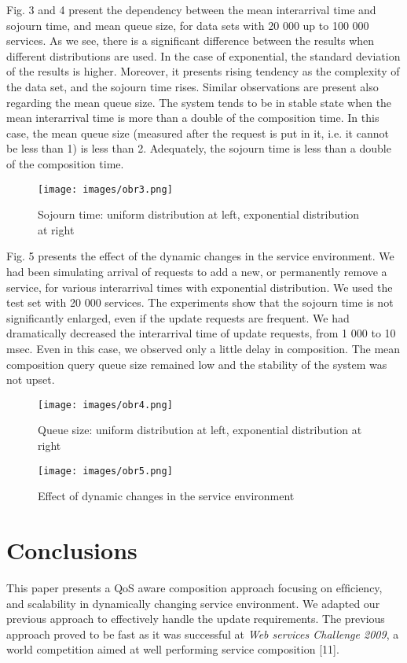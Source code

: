 \documentclass[10pt]{llncs}
\begin{document}
Fig. 3 and 4 present the dependency between the mean interarrival time and sojourn time, and mean queue size, for data sets with 20 000 up to 100 000 services. As we see, there is a signiﬁcant difference between the results when different distributions are used. In the case of exponential, the standard deviation of the results is higher. Moreover, it presents rising tendency as the complexity of the data set, and the sojourn time rises. Similar observations are present also regarding the mean queue size. The system tends to be in stable state when the mean interarrival time is more than a double of the composition time. In this case, the mean queue size (measured after the request is put in it, i.e. it cannot be less than 1) is less than 2. Adequately, the sojourn time is less than a double of the composition time.

\begin{figure}[h]
\texttt{[image: images/obr3.png]}
\caption{Sojourn time: uniform distribution at left, exponential distribution at right}
\end{figure}


Fig. 5 presents the effect of the dynamic changes in the service environment. We had been simulating arrival of requests to add a new, or permanently remove a service, for various interarrival times with exponential distribution. We used the test set with 20 000 services. The experiments show that the sojourn time is not signiﬁcantly enlarged, even if the update requests are frequent. We had dramatically decreased the interarrival time of update requests, from 1 000 to 10 msec. Even in this case, we observed only a little delay in composition. The mean composition query queue size remained low and the stability of the system was not upset.

\begin{figure}[h]
\texttt{[image: images/obr4.png]}
\caption{Queue size: uniform distribution at left, exponential distribution at right}
\end{figure}

\begin{figure}[h]
\texttt{[image: images/obr5.png]}
\caption{Effect of dynamic changes in the service environment}
\end{figure}

\section{Conclusions}
This paper presents a QoS aware composition approach focusing on efﬁciency, and scalability in dynamically changing service environment. We adapted our previous approach to effectively handle the update requirements. The previous approach proved to be fast as it was successful at \textit{Web services Challenge 2009}, a world competition aimed at well performing service composition [11].
\end{document}
